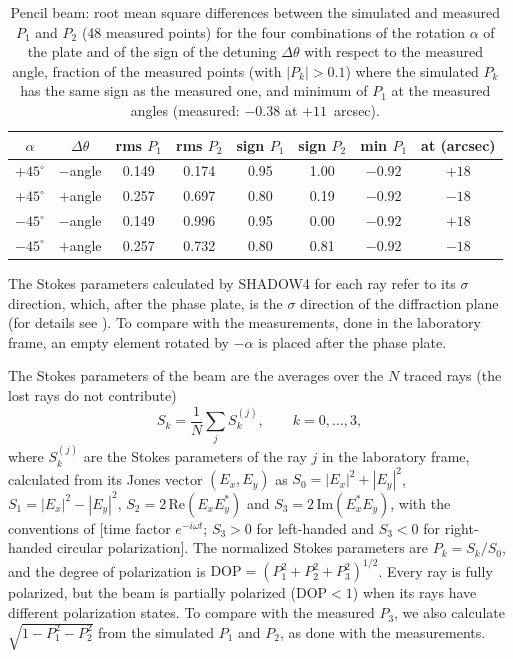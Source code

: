 \documentclass{iucr}
\begin{document}
\begin{table}
\caption{Pencil beam: root mean square differences between the simulated and measured $P_1$ and $P_2$ (48 measured points) for the four combinations of the rotation $\alpha$ of the plate and of the sign of the detuning $\Delta\theta$ with respect to the measured angle, fraction of the measured points (with $|P_k|>0.1$) where the simulated $P_k$ has the same sign as the measured one, and minimum of $P_1$ at the measured angles (measured: $-0.38$ at $+11$~arcsec).}
\label{tab:combinations}
\begin{tabular}{cccccccc}
\toprule
$\alpha$ & $\Delta\theta$ & rms $P_1$ & rms $P_2$ & sign $P_1$ & sign $P_2$ & min $P_1$ & at (arcsec) \\
\midrule
$+45^\circ$ & $-$angle & 0.149 & 0.174 & 0.95 & 1.00 & $-0.92$ & $+18$ \\
$+45^\circ$ & $+$angle & 0.257 & 0.697 & 0.80 & 0.19 & $-0.92$ & $-18$ \\
$-45^\circ$ & $-$angle & 0.149 & 0.996 & 0.95 & 0.00 & $-0.92$ & $+18$ \\
$-45^\circ$ & $+$angle & 0.257 & 0.732 & 0.80 & 0.81 & $-0.92$ & $-18$ \\
\bottomrule
\end{tabular}
\end{table}

The Stokes parameters calculated by SHADOW4 for each ray refer to its $\sigma$ direction, which, after the phase plate, is the $\sigma$ direction of the diffraction plane
(for details see \cite{SanchezdelRio2026efields}). 
To compare with the measurements, done in the laboratory frame, an empty element rotated by $-\alpha$ is placed after the phase plate. 

The Stokes parameters of the beam are the averages over the $N$ traced rays (the lost rays do not contribute)
\begin{equation}\label{eq:stokes_sum}
S_k=\frac{1}{N}\sum_j S_k^{(j)}, \qquad k=0,\dots,3,
\end{equation}
where $S_k^{(j)}$ are the Stokes parameters of the ray $j$ in the laboratory frame, calculated from its Jones vector $(E_x,E_y)$ as $S_0=|E_x|^2+|E_y|^2$, $S_1=|E_x|^2-|E_y|^2$, $S_2=2\,\mathrm{Re}(E_xE_y^*)$ and $S_3=2\,\mathrm{Im}(E_x^*E_y)$,
with the conventions of \cite{SanchezdelRio2026efields} [time factor $e^{-i\omega t}$; $S_3>0$ for left-handed and $S_3<0$ for right-handed circular polarization]. The normalized Stokes parameters are $P_k=S_k/S_0$, and the degree of polarization is $\mathrm{DOP}=(P_1^2+P_2^2+P_3^2)^{1/2}$. Every ray is fully polarized, but the beam is partially polarized (DOP$<1$) when its rays have different polarization states. To compare with the measured $P_3$, we also calculate $\sqrt{1-P_1^2-P_2^2}$ from the simulated $P_1$ and $P_2$, as done with the measurements.
\end{document}
